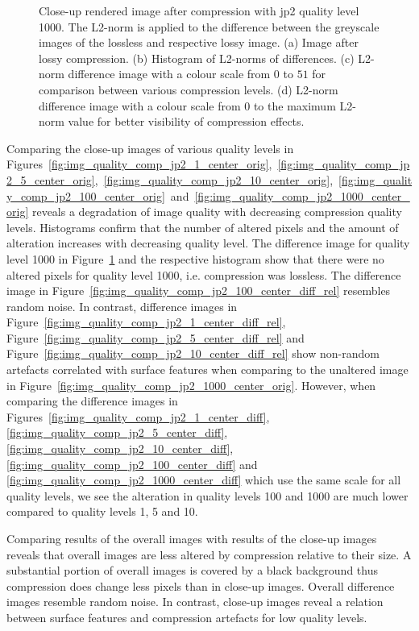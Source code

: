 \begin{figure}[htb]
\begin{subfigure}[b]{0.48\textwidth}
        \caption{}
        \label{fig:img_quality_comp_jp2_1000_center_diff_rel}
    \end{subfigure}
    \caption{Close-up rendered image after compression with \gls{jp2} quality level 1000. The L2-norm is applied to the difference between the greyscale images of the lossless and respective lossy image. (a) Image after lossy compression. (b) Histogram of L2-norms of differences. (c) L2-norm difference image with a colour scale from $0$ to $51$ for comparison between various compression levels. (d) L2-norm difference image with a colour scale from $0$ to the maximum L2-norm value for better visibility of compression effects.}
    \label{fig:img_quality_comp_jp2_1000_center}
\end{figure}

Comparing the close-up images of various quality levels in Figures~\ref{fig:img_quality_comp_jp2_1_center_orig},~\ref{fig:img_quality_comp_jp2_5_center_orig},~\ref{fig:img_quality_comp_jp2_10_center_orig},~\ref{fig:img_quality_comp_jp2_100_center_orig}~and~\ref{fig:img_quality_comp_jp2_1000_center_orig} reveals a degradation of image quality with decreasing compression quality levels. Histograms confirm that the number of altered pixels and the amount of alteration increases with decreasing quality level. The difference image for quality level 1000 in Figure~\ref{fig:img_quality_comp_jp2_1000_center_diff_rel} and the respective histogram show that there were no altered pixels for quality level 1000, i.e. compression was lossless. The difference image in Figure~\ref{fig:img_quality_comp_jp2_100_center_diff_rel} resembles random noise. In contrast, difference images in Figure~\ref{fig:img_quality_comp_jp2_1_center_diff_rel}, Figure~\ref{fig:img_quality_comp_jp2_5_center_diff_rel} and Figure~\ref{fig:img_quality_comp_jp2_10_center_diff_rel} show non-random artefacts correlated with surface features when comparing to the unaltered image in Figure~\ref{fig:img_quality_comp_jp2_1000_center_orig}. However, when comparing the difference images in Figures~\ref{fig:img_quality_comp_jp2_1_center_diff}, \ref{fig:img_quality_comp_jp2_5_center_diff}, \ref{fig:img_quality_comp_jp2_10_center_diff}, \ref{fig:img_quality_comp_jp2_100_center_diff} and \ref{fig:img_quality_comp_jp2_1000_center_diff} which use the same scale for all quality levels, we see the alteration in quality levels \SI{100}{} and \SI{1000}{} are much lower compared to quality levels \SI{1}{}, \SI{5}{} and \SI{10}{}.

Comparing results of the overall images with results of the close-up images reveals that overall images are less altered by compression relative to their size. A substantial portion of overall images is covered by a black background thus compression does change less pixels than in close-up images. Overall difference images resemble random noise. In contrast, close-up images reveal a relation between surface features and compression artefacts for low quality levels.

